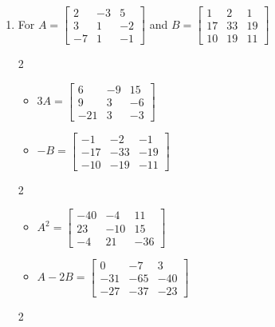 \documentclass{ximera}
\begin{document}
\begin{enumerate}
\item For  $ A = \left[ \begin{array}{rrr} 2 & -3 & 5 \\ 3 & 1 &-2 \\ -7 & 1 & -1 \end{array} \right]$ and $B= \left[ \begin{array}{rrr} 1 & 2 & 1 \\ 17 & 33 & 19 \\ 10 & 19 & 11 \end{array} \right]$ 

\begin{multicols}{2}
\begin{itemize}
\item  $3A = \left[ \begin{array}{rrr} 6 & -9 & 15 \\ 9 & 3 &-6 \\ -21 & 3 & -3 \end{array} \right]$

\item $-B = \left[ \begin{array}{rrr} -1 & -2 & -1 \\ -17 & -33 & -19 \\ -10 & -19 & -11 \end{array} \right]$

\end{itemize}
\end{multicols}


\begin{multicols}{2}
\begin{itemize}

\item  $A^2 = \left[ \begin{array}{rrr} -40 & -4 & 11 \\ 23 & -10 & 15 \\ -4 & 21 & -36 \end{array} \right]$

\item $A-2B = \left[ \begin{array}{rrr} 0 & -7 & 3 \\ -31 & -65 & -40 \\ -27 & -37 & -23 \end{array} \right]$


\end{itemize}
\end{multicols}

\begin{multicols}{2}
\begin{itemize}


\end{itemize}
\end{multicols}
\end{enumerate}
\end{document}
